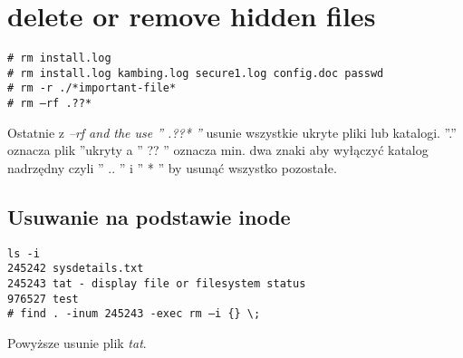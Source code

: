 \documentclass[a4paper,titlepage,12pt]{mwart}
\begin{document}
\section{delete or remove hidden files}
\begin{verbatim}
# rm install.log
# rm install.log kambing.log secure1.log config.doc passwd
# rm -r ./*important-file*
# rm –rf .??*
\end{verbatim}
Ostatnie z \textit{–rf and the use '' .??* ''} usunie wszystkie ukryte pliki lub katalogi. 
''.'' oznacza plik ''ukryty a '' ?? '' oznacza min. dwa znaki aby wyłączyć katalog nadrzędny czyli '' .. '' i '' * '' by usunąć wszystko pozostałe.
\subsection{Usuwanie na podstawie \textbf{inode}}
\begin{verbatim}
ls -i
245242 sysdetails.txt
245243 tat - display file or filesystem status
976527 test
# find . -inum 245243 -exec rm –i {} \;
\end{verbatim}
Powyższe usunie plik \textit{tat}.
\end{document}
